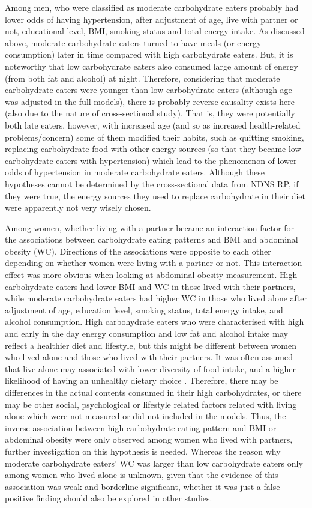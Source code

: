 Among men, who were classified as moderate carbohydrate eaters probably had lower odds of having hypertension, after adjustment of age, live with partner or not, educational level, BMI, smoking status and total energy intake. As discussed above, moderate carbohydrate eaters turned to have meals (or energy consumption) later in time compared with high carbohydrate eaters. But, it is noteworthy that low carbohydrate eaters also consumed large amount of energy (from both fat and alcohol) at night. Therefore, considering that moderate carbohydrate eaters were younger than low carbohydrate eaters (although age was adjusted in the full models), there is probably reverse causality exists here (also due to the nature of cross-sectional study). That is, they were potentially both late eaters, however, with increased age (and so as increased health-related problems/concern) some of them modified their habits, such as quitting smoking, replacing carbohydrate food with other energy sources (so that they became low carbohydrate eaters with hypertension) which lead to the phenomenon of lower odds of hypertension in moderate carbohydrate eaters. Although these hypotheses cannot be determined by the cross-sectional data from NDNS RP, if they were true, the energy sources they used to replace carbohydrate in their diet were apparently not very wisely chosen. 

Among women, whether living with a partner became an interaction factor for the associations between carbohydrate eating patterns and BMI and abdominal obesity (WC). Directions of the associations were opposite to each other depending on whether women were living with a partner or not. This interaction effect was more obvious when looking at abdominal obesity measurement. High carbohydrate eaters had lower BMI and WC in those lived with their partners, while moderate carbohydrate eaters had higher WC in those who lived alone after adjustment of age, education level, smoking status, total energy intake, and alcohol consumption. High carbohydrate eaters who were characterised with high and early in the day energy consumption and low fat and alcohol intake may reflect a healthier diet and lifestyle, but this might be different between women who lived alone and those who lived with their partners. It was often assumed that live alone may associated with lower diversity of food intake, and a higher likelihood of having an unhealthy dietary choice \parencite{hanna2015relationship}. Therefore, there may be differences in the actual contents consumed in their high carbohydrates, or there may be other social, psychological or lifestyle related factors related with living alone which were not measured or did not included in the models. Thus, the inverse association between high carbohydrate eating pattern and BMI or abdominal obesity were only observed among women who lived with partners, further investigation on this hypothesis is needed. Whereas the reason why moderate carbohydrate eaters' WC was larger than low carbohydrate eaters only among women who lived alone is unknown, given that the evidence of this association was weak and borderline significant, whether it was just a false positive finding should also be explored in other studies.

